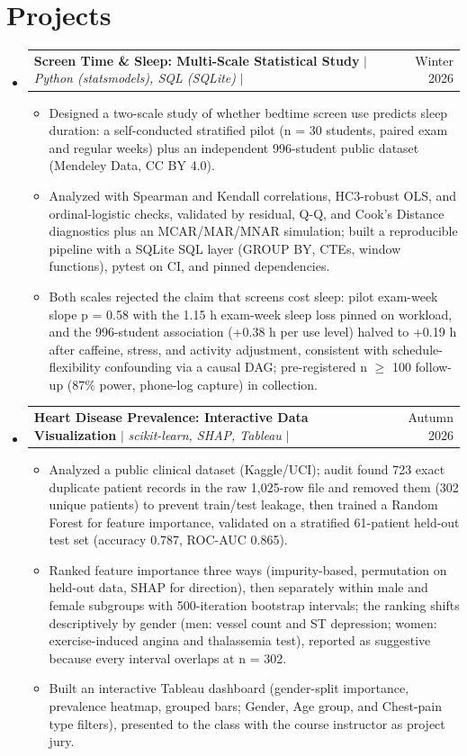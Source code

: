 \documentclass[letterpaper,11pt]{article}
\makeatletter
\newcommand{\resumeItem}[1]{
  \item\small{
    {#1 \vspace{-2pt}}
  }
}
\newcommand{\resumeProjectHeading}[2]{
    \vspace{-2pt}\item
    \begin{tabularx}{\textwidth}{@{}Xr@{}}
      \small#1 & #2 \\
    \end{tabularx}\vspace{-7pt}
}
\newcommand{\resumeSubHeadingListStart}{\begin{itemize}[leftmargin=0in, label={}]}
\newcommand{\resumeSubHeadingListEnd}{\end{itemize}}
\newcommand{\resumeItemListStart}{\begin{itemize}[leftmargin=0.15in, label=\textbullet]}
\newcommand{\resumeItemListEnd}{\end{itemize}\vspace{-2pt}}
\makeatother
\begin{document}
\section{Projects}
    \resumeSubHeadingListStart
      \resumeProjectHeading
          {\textbf{Screen Time \& Sleep: Multi-Scale Statistical Study} $|$ \emph{Python (statsmodels), SQL (SQLite)} $|$ \href{https://github.com/VrundaJoshi25/screen-time-sleep-analysis.git}{\faGithub}}{Winter 2026}
          \resumeItemListStart
            \resumeItem{Designed a two-scale study of whether bedtime screen use predicts sleep duration: a self-conducted stratified pilot (n = 30 students, paired exam and regular weeks) plus an independent 996-student public dataset (Mendeley Data, CC BY 4.0).}
            \resumeItem{Analyzed with Spearman and Kendall correlations, HC3-robust OLS, and ordinal-logistic checks, validated by residual, Q-Q, and Cook's Distance diagnostics plus an MCAR/MAR/MNAR simulation; built a reproducible pipeline with a SQLite SQL layer (GROUP BY, CTEs, window functions), pytest on CI, and pinned dependencies.}
            \resumeItem{Both scales rejected the claim that screens cost sleep: pilot exam-week slope p = 0.58 with the 1.15 h exam-week sleep loss pinned on workload, and the 996-student association (+0.38 h per use level) halved to +0.19 h after caffeine, stress, and activity adjustment, consistent with schedule-flexibility confounding via a causal DAG; pre-registered n $\geq$ 100 follow-up (87\% power, phone-log capture) in collection.}
          \resumeItemListEnd
      \resumeProjectHeading
          {\textbf{Heart Disease Prevalence: Interactive Data Visualization} $|$ \emph{scikit-learn, SHAP, Tableau} $|$ \href{https://github.com/VrundaJoshi25/heart-disease-tableau-dashboard.git}{\faGithub}}{Autumn 2026}
          \resumeItemListStart
            \resumeItem{Analyzed a public clinical dataset (Kaggle/UCI); audit found 723 exact duplicate patient records in the raw 1,025-row file and removed them (302 unique patients) to prevent train/test leakage, then trained a Random Forest for feature importance, validated on a stratified 61-patient held-out test set (accuracy 0.787, ROC-AUC 0.865).}
            \resumeItem{Ranked feature importance three ways (impurity-based, permutation on held-out data, SHAP for direction), then separately within male and female subgroups with 500-iteration bootstrap intervals; the ranking shifts descriptively by gender (men: vessel count and ST depression; women: exercise-induced angina and thalassemia test), reported as suggestive because every interval overlaps at n = 302.}
            \resumeItem{Built an interactive Tableau dashboard (gender-split importance, prevalence heatmap, grouped bars; Gender, Age group, and Chest-pain type filters), presented to the class with the course instructor as project jury.}
          \resumeItemListEnd
    \resumeSubHeadingListEnd
\end{document}
